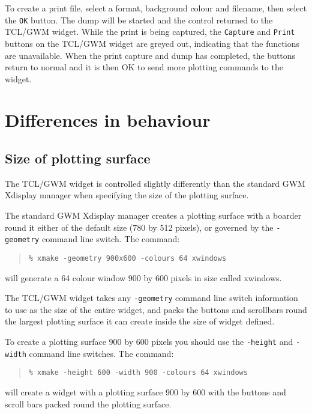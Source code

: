To create a print file, select a format, background colour and filename,
then select the {\tt{OK}} button.  The dump will be started and the control
returned to the TCL/GWM widget.  While the print is being captured, the
{\tt{Capture}} and {\tt{Print}} buttons on the TCL/GWM widget are greyed
out, indicating that the functions are unavailable.  When the print capture
and dump has completed, the buttons return to normal and it is then OK to
send more plotting commands to the widget.

\section{\label{differences}Differences in behaviour}

\subsection{\label{size_of_plotting_surface}Size of plotting surface}

The TCL/GWM widget is controlled slightly differently than the standard GWM
Xdisplay manager when specifying the size of the plotting surface.

The standard GWM Xdisplay manager creates a plotting surface with a boarder
round it either of the default size (780 by 512 pixels), or governed by the
{\tt{-geometry}} command line switch.  The command:

\begin{quote}
{\tt \% xmake -geometry 900x600 -colours 64 xwindows}
\end{quote}

will generate a 64 colour window 900 by 600 pixels in size called xwindows.

The TCL/GWM widget takes any {\tt{-geometry}} command line switch information
to use as the size of the entire widget, and packs the buttons and scrollbars
round the largest plotting surface it can create inside the size of widget
defined.

To create a plotting surface 900 by 600 pixels you should use the
{\tt{-height}} and {\tt{-width}} command line switches.  The command:

\begin{quote}
{\tt \% xmake -height 600 -width 900 -colours 64 xwindows}
\end{quote}

will create a widget with a plotting surface 900 by 600 with the buttons
and scroll bars packed round the plotting surface.

